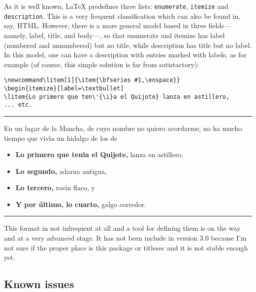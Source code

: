 \documentclass[a4paper]{ltxguide}
\newcommand\3{\unskip\enspace\fbox{\fontsize{4}{4}\selectfont NEW 3.0}}
\begin{document}
\begin{enumerate}[leftmargin=*]
\begin{enumerate}[leftmargin=\parindent]
\begin{enumerate}[labelindent=\parindent,|\allowbreak
| leftmargin=*,|\allowbreak| label=\Roman*.,|\allowbreak
| widest=IV,|\allowbreak| align=left]
\begin{enumerate}[label=\fbox{\arabic*}]
As it is well known, \LaTeX{} predefines three lists:
\texttt{enumerate}, \texttt{itemize} and \texttt{description}.  This
is a very frequent classification which can also be found in, say,
HTML. However, there is a more general model based in three
fields---namely, label, title, and body---, so that enumerate and
itemize has label (numbered and unnumbered) but no title, while
description has title but no label.  In this model, one can have a
description with entries marked with labels, as for example (of 
course, this simple solution is far from satistactory):
\begin{verbatim}
\newcommand\litem[1]{\item{\bfseries #1,\enspace}}
\begin{itemize}[label=\textbullet]
\litem{Lo primero que ten\'{\i}a el Quijote} lanza en astillero,
... etc.
\end{verbatim}

\vskip6pt
\goodbreak
\hrule
\vskip6pt

\newcommand\litem[1]{\item{\bfseries #1,\enspace}}
En un lugar de la Mancha, de cuyo nombre no quiero acordarme,
no ha mucho tiempo que viv\'{\i}a un hidalgo de los de
\begin{itemize}[label=\textbullet]
\litem{Lo primero que ten\'{\i}a el Quijote} lanza en astillero,
\litem{Lo segundo} adarna antigua,
\litem{Lo tercero} roc\'{\i}n flaco, y
\litem{Y por \'{u}ltimo, lo cuarto} galgo corredor.
\end{itemize}

\vskip6pt
\goodbreak
\hrule
\vskip6pt

This format in not infrequent at all and a tool for defining them is 
on the way and at a very advanced stage. It has not been include in 
version 3.0 because I'm not sure if the proper place is this package 
or \textsf{titlesec} and it is not stable enough yet.

\subsection{Known issues}

\end{enumerate}
\end{enumerate}
\end{enumerate}
\end{enumerate}
\end{document}
